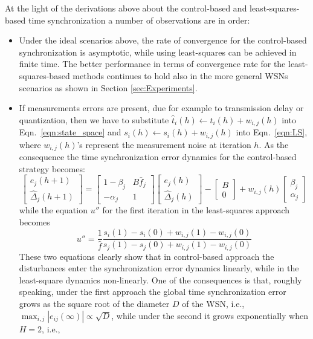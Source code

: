 \documentclass[english,a4paper,10pt,final]{article}
\numberwithin{equation}{section}
\numberwithin{figure}{section}
\begin{document}
At the light of the derivations above about the control-based and least-squares-based time synchronization a number of observations are in order:
\begin{itemize}
\item Under the ideal scenarios above, the rate of convergence for the control-based synchronization is asymptotic, while using least-squares can be achieved in finite time. The better performance in terms of convergence rate for the least-squares-based methods continues to hold also in the more general WSNs scenarios as shown in Section \ref{sec:Experiments}.
\item If measurements errors are present, due for example to transmission delay or quantization, then we have to substitute  $\hat{t}_{i}(h)\leftarrow \hat{t}_{i}(h)+w_{i,j}(h)$ into Eqn.~\eqref{eqn:state_space} and $s_{i}(h)\leftarrow s_{i}(h)+w_{i,j}(h)$ into Eqn.~\eqref{eqn:LS}, where $w_{i,j}(h)$'s represent the measurement noise at iteration $h$. As the consequence the time synchronization error dynamics for the control-based strategy becomes:
\begin{equation}\label{eqn:noise}
 \left[ \begin{array}{c} e_j(h+1) \\ \hat \Delta_j(h+1) \end{array} \right] =\left[ \begin{array}{cc} 1-\beta_j & B \bar f_j\\ -\alpha_j & 1\end{array} \right]\left[ \begin{array}{c} e_j(h) \\ \hat \Delta_j(h) \end{array} \right]-\left[ \begin{array}{c}  B \\ 0 \end{array} \right] +w_{i,j}(h)  \left[ \begin{array}{c} \beta_j \\ \alpha_j \end{array} \right]  \end{equation}
while the equation $u''$ for the first iteration in the least-squares approach becomes
$$ u'' = \frac{1}{\hat f }\frac{s_i(1)-s_i(0)+w_{i,j}(1)-w_{i,j}(0)}{s_j(1)-s_j(0)+w_{i,j}(1)-w_{i,j}(0)}$$
These two equations clearly show that in control-based approach the disturbances enter the synchronization error dynamics linearly, while in the least-square dynamics non-linearly. One of the consequences is that, roughly speaking, under the first approach the global time synchronization error grows as the square root of the diameter $D$ of the WSN, i.e., $\max_{i,j}|e_{ij}(\infty)| \propto \sqrt{D}$, while under the second it grows exponentially when $H=2$, i.e.,

\end{itemize}
\end{document}
